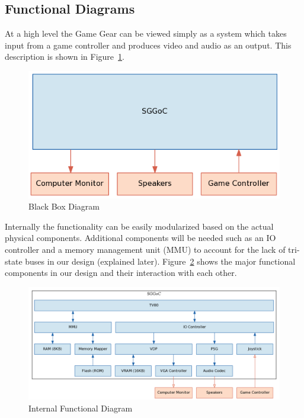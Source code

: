 \documentclass{article}
\begin{document}
\newpage
\subsection{Functional Diagrams}
At a high level the Game Gear can be viewed simply as a system which takes
input from a game controller and produces video and audio as an output. This
description is shown in Figure~\ref{fig:external}.

\begin{figure}[H]
\centering
\includegraphics[scale=0.4]{../block_diagrams/block_diagram_external.png}
\caption{Black Box Diagram}
\label{fig:external}
\end{figure}

Internally the functionality can be easily modularized based on the actual
physical components. Additional components will be needed such as an IO
controller and a memory management unit (MMU) to account for the lack of
tri-state buses in our design (explained later). Figure~\ref{fig:internal}
shows the major functional components in our design and their interaction with
each other.

\begin{figure}[H]
\centering
\includegraphics[scale=0.4]{../block_diagrams/block_diagram_internal.png}
\caption{Internal Functional Diagram}
\label{fig:internal}
\end{figure}
\end{document}
